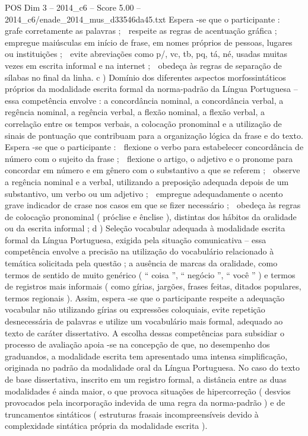 \begin{textsample}{POS Dim 3 – 2014\_c6 – Score 5.00 – 2014\_c6/enade\_2014\_mus\_d33546da45.txt}
Espera -se que o participante :  grafe corretamente as palavras ;  respeite as regras de acentuação gráfica ;  empregue maiúsculas em início de frase, em nomes próprios de pessoas, lugares ou instituições ;  evite abreviações como p/, vc, tb, pq, tá, né, usadas muitas vezes em escrita informal e na internet ;  obedeça às regras de separação de sílabas no final da linha. c ) Domínio dos diferentes aspectos morfossintáticos próprios da modalidade escrita formal da norma-padrão da Língua Portuguesa – essa competência envolve : a concordância nominal, a concordância verbal, a regência nominal, a regência verbal, a flexão nominal, a flexão verbal, a correlação entre os tempos verbais, a colocação pronominal e a utilização de sinais de pontuação que contribuam para a organização lógica da frase e do texto.
Espera -se que o participante :  flexione o verbo para estabelecer concordância de número com o sujeito da frase ;  flexione o artigo, o adjetivo e o pronome para concordar em número e em gênero com o substantivo a que se referem ;  observe a regência nominal e a verbal, utilizando a preposição adequada depois de um substantivo, um verbo ou um adjetivo ;  empregue adequadamente o acento grave indicador de crase nos casos em que se fizer necessário ;  obedeça às regras de colocação pronominal ( próclise e ênclise ), distintas dos hábitos da oralidade ou da escrita informal ; d ) Seleção vocabular adequada à modalidade escrita formal da Língua Portuguesa, exigida pela situação comunicativa – essa competência envolve a precisão na utilização do vocabulário relacionado à temática solicitada pela questão ; a ausência de marcas da oralidade, como termos de sentido de muito genérico ( “ coisa ”, “ negócio ”, “ você ” ) e termos de registros mais informais ( como gírias, jargões, frases feitas, ditados populares, termos regionais ).
Assim, espera -se que o participante respeite a adequação vocabular não utilizando gírias ou expressões coloquiais, evite repetição desnecessária de palavras e utilize um vocabulário mais formal, adequado ao texto de caráter dissertativo.
A escolha dessas competências para subsidiar o processo de avaliação apoia -se na concepção de que, no desempenho dos graduandos, a modalidade escrita tem apresentado uma intensa simplificação, originada no padrão da modalidade oral da Língua Portuguesa.
No caso do texto de base dissertativa, inscrito em um registro formal, a distância entre as duas modalidades é ainda maior, o que provoca situações de hipercorreção ( desvios provocados pela incorporação indevida de uma regra da norma-padrão ) e de truncamentos sintáticos ( estruturas frasais incompreensíveis devido à complexidade sintática própria da modalidade escrita ).

\end{textsample}
